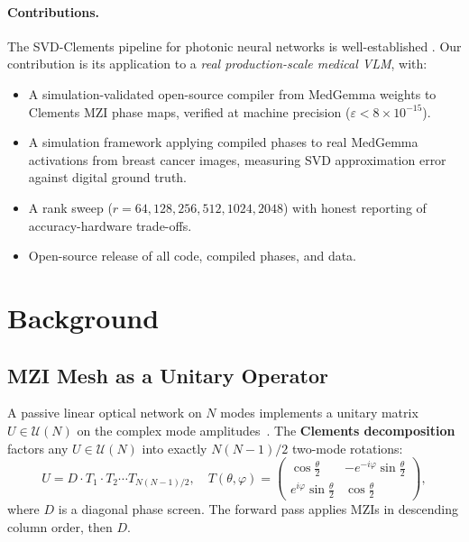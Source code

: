 \documentclass{article}
\begin{document}
\paragraph{Contributions.}
The SVD-Clements pipeline for photonic neural networks is well-established
\citep{reck1994, clements2016, shen2017, pai2023}.
Our contribution is its application to a \emph{real production-scale medical
VLM}, with:
\begin{itemize}
  \item[(1)] A simulation-validated open-source compiler from MedGemma weights
             to Clements MZI phase maps, verified at machine precision
             ($\varepsilon < 8 \times 10^{-15}$).
  \item[(2)] A simulation framework applying compiled phases to real MedGemma
             activations from breast cancer images, measuring SVD approximation
             error against digital ground truth.
  \item[(3)] A rank sweep ($r = 64, 128, 256, 512, 1024, 2048$) with
             honest reporting of accuracy-hardware trade-offs.
  \item[(4)] Open-source release of all code, compiled phases, and data.
\end{itemize}

\section{Background}

\subsection{MZI Mesh as a Unitary Operator}

A passive linear optical network on $N$ modes implements a unitary matrix
$U \in \mathcal{U}(N)$ on the complex mode amplitudes~\citep{reck1994}.
The \textbf{Clements decomposition}~\citep{clements2016} factors any
$U \in \mathcal{U}(N)$ into exactly $N(N-1)/2$ two-mode rotations:
\begin{equation}
  U = D \cdot T_1 \cdot T_2 \cdots T_{N(N-1)/2},
  \quad
  T(\theta,\varphi) = \begin{pmatrix}
    \cos\tfrac{\theta}{2} & -e^{-i\varphi}\sin\tfrac{\theta}{2} \\
    e^{i\varphi}\sin\tfrac{\theta}{2} & \cos\tfrac{\theta}{2}
  \end{pmatrix},
  \label{eq:clements}
\end{equation}
where $D$ is a diagonal phase screen.
The forward pass applies MZIs in descending column order, then $D$.
\end{document}
